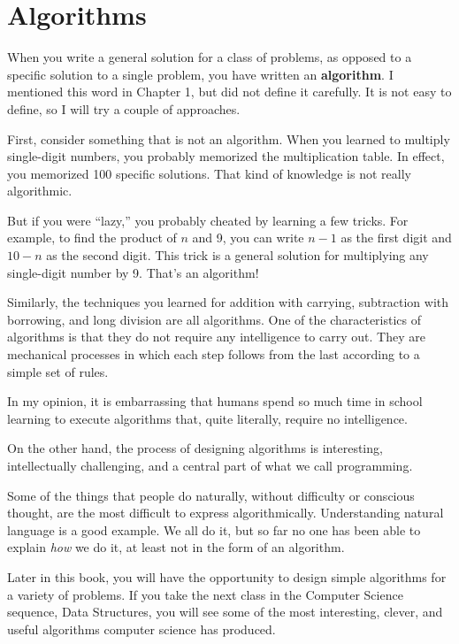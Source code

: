 \section{Algorithms}
\label{algorithm}

When you write a general solution for a class of problems, as opposed
to a specific solution to a single problem, you have written an {\bf
algorithm}.  I mentioned this word in Chapter 1, but did not define it
carefully.  It is not easy to define, so I will try a couple of
approaches.

First, consider something that is not an algorithm.
When you learned to multiply single-digit numbers, you probably
memorized the multiplication table.  In effect, you memorized 100
specific solutions.  That kind of knowledge is not really algorithmic.

But if you were ``lazy,'' you probably cheated by learning a few
tricks.  For example, to find the product of $n$ and 9, you can write
$n-1$ as the first digit and $10-n$ as the second digit.  This trick
is a general solution for multiplying any single-digit number by 9.
That's an algorithm!

Similarly, the techniques you learned for addition with carrying,
subtraction with borrowing, and long division are all algorithms.  One
of the characteristics of algorithms is that they do not require any
intelligence to carry out.  They are mechanical processes in which
each step follows from the last according to a simple set of rules.

In my opinion, it is embarrassing that humans spend so much time in
school learning to execute algorithms that, quite literally, require
no intelligence.

On the other hand, the process of designing algorithms is interesting,
intellectually challenging, and a central part of what we call
programming.

Some of the things that people do naturally, without difficulty
or conscious thought, are the most difficult to express
algorithmically.  Understanding natural language is a good
example.  We all do it, but so far no one has been able to
explain {\em how} we do it, at least not in the form of an
algorithm.

Later in this book, you will have the opportunity to design
simple algorithms for a variety of problems.  If you take
the next class in the Computer Science sequence, Data Structures,
you will see some of the most interesting, clever, and
useful algorithms computer science has produced.

